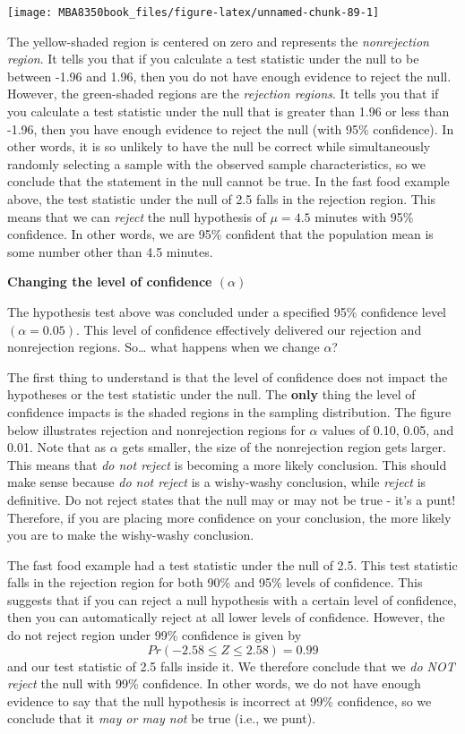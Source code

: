 \documentclass[
]{book}
\begin{document}
\begin{center}\texttt{[image: MBA8350book\_files/figure-latex/unnamed-chunk-89-1]} \end{center}

The yellow-shaded region is centered on zero and represents the \emph{nonrejection region}. It tells you that if you calculate a test statistic under the null to be between -1.96 and 1.96, then you do not have enough evidence to reject the null. However, the green-shaded regions are the \emph{rejection regions}. It tells you that if you calculate a test statistic under the null that is greater than 1.96 or less than -1.96, then you have enough evidence to reject the null (with 95\% confidence). In other words, it is so unlikely to have the null be correct while simultaneously randomly selecting a sample with the observed sample characteristics, so we conclude that the statement in the null cannot be true. In the fast food example above, the test statistic under the null of 2.5 falls in the rejection region. This means that we can \emph{reject} the null hypothesis of \(\mu=4.5\) minutes with 95\% confidence. In other words, we are 95\% confident that the population mean is some number other than 4.5 minutes.

\textbf{Changing the level of confidence \((\alpha)\)}

The hypothesis test above was concluded under a specified 95\% confidence level \((\alpha=0.05)\). This level of confidence effectively delivered our rejection and nonrejection regions. So\ldots{} what happens when we change \(\alpha\)?

The first thing to understand is that the level of confidence does not impact the hypotheses or the test statistic under the null. The \textbf{only} thing the level of confidence impacts is the shaded regions in the sampling distribution. The figure below illustrates rejection and nonrejection regions for \(\alpha\) values of 0.10, 0.05, and 0.01. Note that as \(\alpha\) gets smaller, the size of the nonrejection region gets larger. This means that \emph{do not reject} is becoming a more likely conclusion. This should make sense because \emph{do not reject} is a wishy-washy conclusion, while \emph{reject} is definitive. Do not reject states that the null may or may not be true - it's a punt! Therefore, if you are placing more confidence on your conclusion, the more likely you are to make the wishy-washy conclusion.

The fast food example had a test statistic under the null of 2.5. This test statistic falls in the rejection region for both 90\% and 95\% levels of confidence. This suggests that if you can reject a null hypothesis with a certain level of confidence, then you can automatically reject at all lower levels of confidence. However, the do not reject region under 99\% confidence is given by
\[Pr(-2.58 \leq Z \leq 2.58)=0.99\]
and our test statistic of 2.5 falls inside it. We therefore conclude that we \emph{do NOT reject} the null with 99\% confidence. In other words, we do not have enough evidence to say that the null hypothesis is incorrect at 99\% confidence, so we conclude that it \emph{may or may not} be true (i.e., we punt).
\end{document}
